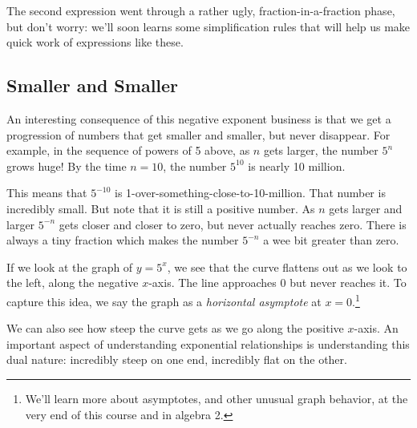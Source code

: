 The second expression went through a rather ugly, fraction-in-a-fraction phase, but don't worry: we'll soon learns some simplification rules that will help us make quick work of expressions like these.

\subsection{Smaller and Smaller}

An interesting consequence of this negative exponent business is that we get a progression of numbers that get smaller and smaller, but never disappear. For example, in the sequence of powers of 5 above, as $n$ gets larger, the number $5^n$ grows huge! By the time $n=10$, the number $5^{10}$ is nearly 10 million.

This means that $5^{-10}$ is 1-over-something-close-to-10-million. That number is incredibly small. But note that it is still a positive number. As $n$ gets larger and larger $5^{-n}$ gets closer and closer to zero, but never actually reaches zero. There is always a tiny fraction which makes the number $5^{-n}$ a wee bit greater than zero.

If we look at the graph of $y=5^x$, we see that the curve flattens out as we look to the left, along the negative $x$-axis. The line approaches 0 but never reaches it. To capture this idea, we say the graph as a \textit{horizontal asymptote} at $x=0$.\footnote{We'll learn more about asymptotes, and other unusual graph behavior, at the very end of this course and in algebra 2.}

\begin{center}
\end{center}

We can also see how steep the curve gets as we go along the positive $x$-axis. An important aspect of understanding exponential relationships is understanding this dual nature: incredibly steep on one end, incredibly flat on the other.

